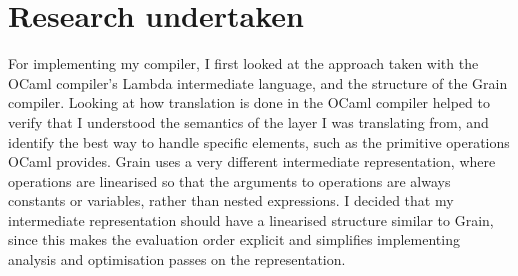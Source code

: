 

\section{Research undertaken}
For implementing my compiler, I first looked at the approach taken with the OCaml compiler's Lambda intermediate language, and the structure of the Grain compiler. Looking at how translation is done in the OCaml compiler helped to verify that I understood the semantics of the layer I was translating from, and identify the best way to handle specific elements, such as the primitive operations OCaml provides. Grain uses a very different intermediate representation, where operations are linearised so that the arguments to operations are always constants or variables, rather than nested expressions. 
I decided that my intermediate representation should have a linearised structure similar to Grain, since this makes the evaluation order explicit and simplifies implementing analysis and optimisation passes on the representation.




